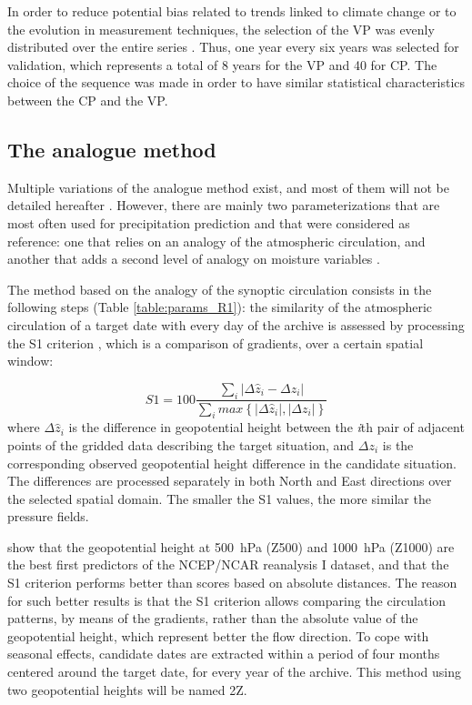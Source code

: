 \documentclass[review]{elsarticle}
\begin{document}
In order to reduce potential bias related to trends linked to climate change or to the evolution in measurement techniques, the selection of the VP was evenly distributed over the entire series \citep{BenDaoud2010}. Thus, one year every six years was selected for validation, which represents a total of 8 years for the VP and 40 for CP. The choice of the sequence was made in order to have similar statistical characteristics between the CP and the VP.


\subsection{The analogue method}
\label{sec:references}

Multiple variations of the analogue method exist, and most of them will not be detailed hereafter \cite[see][for more comprehensive listings]{BenDaoud2016}. However, there are mainly two parameterizations that are most often used for precipitation prediction and that were considered as reference: one that relies on an analogy of the atmospheric circulation, and another that adds a second level of analogy on moisture variables \citep{Obled2002, Bontron2005, Marty2012}.

The method based on the analogy of the synoptic circulation consists in the following steps (Table \ref{table:params_R1}): the similarity of the atmospheric circulation of a target date with every day of the archive is assessed by processing the S1 criterion \citep[Eq.\ \ref{eq:S1}, ][]{Teweles1954, Drosdowsky2003}, which is a comparison of gradients, over a certain spatial window:

\begin{equation}
\label{eq:S1}
S1=100 \frac {\displaystyle \sum_{i} \vert \Delta\hat{z}_{i} - \Delta z_{i} \vert}
{\displaystyle \sum_{i} max\left\lbrace \vert \Delta\hat{z}_{i} \vert , \vert \Delta z_{i} \vert \right\rbrace }
\end{equation}
where $\Delta \hat{z}_{i}$ is the difference in geopotential height between the \textit{i}th pair of adjacent points of the gridded data describing the target situation, and $\Delta z_{i}$ is the corresponding observed geopotential height difference in the candidate situation. The differences are processed separately in both North and East directions over the selected spatial domain. The smaller the S1 values, the more similar the pressure fields.

\citet{Bontron2005} show that the geopotential height at 500~hPa (Z500) and 1000~hPa (Z1000) are the best first predictors of the NCEP/NCAR reanalysis I dataset, and that the S1 criterion performs better than scores based on absolute distances. The reason for such better results is that the S1 criterion allows comparing the circulation patterns, by means of the gradients, rather than the absolute value of the geopotential height, which represent better the flow direction. To cope with seasonal effects, candidate dates are extracted within a period of four months centered around the target date, for every year of the archive. This method using two geopotential heights will be named 2Z.
\end{document}
